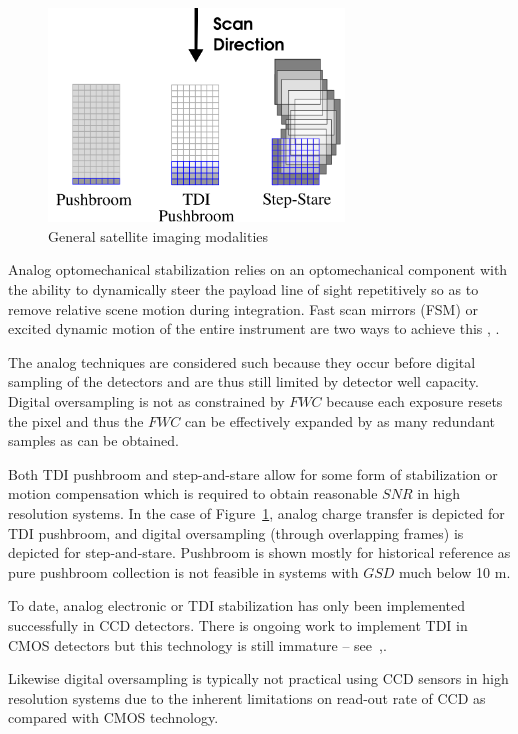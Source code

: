 \documentclass[]{spieman}  %
\begin{document}
\begin{figure}[h!t]
\centering
\includegraphics[width=0.7\textwidth]{figures/modalities.png}
\caption{General satellite imaging modalities}
\label{fig:modalities}
\end{figure}

Analog optomechanical stabilization relies on an optomechanical component with the ability to dynamically steer the payload line of sight repetitively so as to remove relative scene motion during integration.  Fast scan mirrors (FSM) or excited dynamic motion of the entire instrument are two ways to achieve this \cite{patent:jonny}, \cite{patent:dirk}.

The analog techniques are considered such because they occur before digital sampling of the detectors and are thus still limited by detector well capacity.  Digital oversampling is not as constrained by $FWC$ because each exposure resets the pixel and thus the $FWC$ can be effectively expanded by as many redundant samples as can be obtained.

Both TDI pushbroom and step-and-stare allow for some form of stabilization or motion compensation which is required to obtain reasonable $SNR$ in high resolution systems.  In the case of Figure~\ref{fig:modalities}, analog charge transfer is depicted for TDI pushbroom, and digital oversampling (through overlapping frames) is depicted for step-and-stare.  Pushbroom is shown mostly for historical reference as pure pushbroom collection is not feasible in systems with $GSD$ much below 10 m.

To date, analog electronic or TDI stabilization has only been implemented successfully in CCD detectors.  There is ongoing work to implement TDI in CMOS detectors but this technology is still immature -- see~\cite{jerram},\cite{rushton}.

Likewise digital oversampling is typically not practical using CCD sensors in high resolution systems due to the inherent limitations on read-out rate of CCD as compared with CMOS technology.
\end{document}
